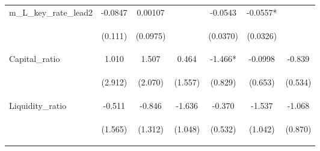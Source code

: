 \documentclass[]{article}
\begin{document}
\begin{center}
\begin{tabular}{lcccccc}
m\_L\_key\_rate\_lead2 & -0.0847 & 0.00107 &  & -0.0543 & -0.0557* &  \\
\vspace{4pt} & \begin{footnotesize}(0.111)\end{footnotesize} & \begin{footnotesize}(0.0975)\end{footnotesize} & \begin{footnotesize}\end{footnotesize} & \begin{footnotesize}(0.0370)\end{footnotesize} & \begin{footnotesize}(0.0326)\end{footnotesize} & \begin{footnotesize}\end{footnotesize} \\
Capital\_ratio & 1.010 & 1.507 & 0.464 & -1.466* & -0.0998 & -0.839 \\
\vspace{4pt} & \begin{footnotesize}(2.912)\end{footnotesize} & \begin{footnotesize}(2.070)\end{footnotesize} & \begin{footnotesize}(1.557)\end{footnotesize} & \begin{footnotesize}(0.829)\end{footnotesize} & \begin{footnotesize}(0.653)\end{footnotesize} & \begin{footnotesize}(0.534)\end{footnotesize} \\
Liquidity\_ratio & -0.511 & -0.846 & -1.636 & -0.370 & -1.537 & -1.068 \\
\vspace{4pt} & \begin{footnotesize}(1.565)\end{footnotesize} & \begin{footnotesize}(1.312)\end{footnotesize} & \begin{footnotesize}(1.048)\end{footnotesize} & \begin{footnotesize}(0.532)\end{footnotesize} & \begin{footnotesize}(1.042)\end{footnotesize} & \begin{footnotesize}(0.870)\end{footnotesize} \\

\end{tabular}
\end{center}
\end{document}
